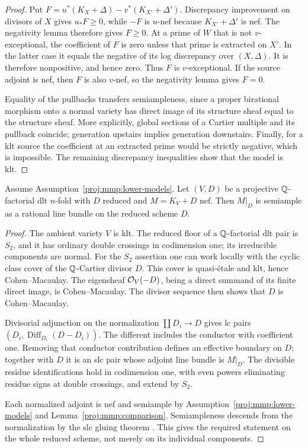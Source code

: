 \begin{proof}
Put \(F=u^*(K_X+\Delta)-v^*(K_{X'}+\Delta')\).
Discrepancy improvement on divisors of \(X\) gives \(u_*F\geq 0\),
while \(-F\) is \(u\)-nef because \(K_{X'}+\Delta'\) is nef.
The negativity lemma therefore gives \(F\geq 0\).
At a prime of \(W\) that is not \(v\)-exceptional, the coefficient
of \(F\) is zero unless that prime is extracted on \(X'\).
In the latter case it equals the negative of its log discrepancy
over \((X,\Delta)\). It is therefore nonpositive, and hence zero.
Thus \(F\) is \(v\)-exceptional. If the source adjoint is nef,
then \(F\) is also \(v\)-nef, so the negativity lemma gives \(F=0\).

Equality of the pullbacks transfers semiampleness, since a proper
birational morphism onto a normal variety has direct image of its
structure sheaf equal to the structure sheaf. More explicitly,
global sections of a Cartier multiple and its pullback coincide;
generation upstairs implies generation downstairs.
Finally, for a klt source the coefficient at an extracted prime
would be strictly negative, which is impossible. The remaining
discrepancy inequalities show that the model is klt.
\end{proof}

\begin{proposition}
\label{proj:prop:boundary-restriction}
Assume Assumption~\ref{proj:mmp:lower-models}. Let \((V,D)\) be a
projective \(\mathbb{Q}\)-factorial dlt \(n\)-fold with \(D\) reduced and
\(M=K_V+D\) nef. Then \(M|_D\) is semiample as a rational line
bundle on the reduced scheme \(D\).
\end{proposition}

\begin{proof}
The ambient variety \(V\) is klt. The reduced floor of a
\(\mathbb{Q}\)-factorial dlt pair is \(S_2\), and it has ordinary double
crossings in codimension one; its irreducible components are normal.
For the \(S_2\) assertion one can work locally with the cyclic
class cover of the \(\mathbb{Q}\)-Cartier divisor \(D\). This cover is
quasi-\'etale and klt, hence Cohen--Macaulay. The eigensheaf
\(\mathcal{O}_V(-D)\), being a direct summand of its finite direct image,
is Cohen--Macaulay. The divisor sequence then shows that \(D\)
is Cohen--Macaulay.

Divisorial adjunction on the normalization
\(\coprod D_i\to D\) gives lc pairs
\((D_i,\operatorname{Diff}_{D_i}(D-D_i))\).
The different includes the conductor with coefficient one.
Removing that conductor contribution defines an effective boundary
on \(D\); together with \(D\) it is an slc pair whose adjoint
line bundle is \(M|_D\). The divisible residue identifications
hold in codimension one, with even powers eliminating residue
signs at double crossings, and extend by \(S_2\).

Each normalized adjoint is nef and semiample by
Assumption~\ref{proj:mmp:lower-models} and
Lemma~\ref{proj:mmp:comparison}.
Semiampleness descends from the normalization by the slc gluing
theorem \cite[Theorem~1.5, equivalently Theorem~4.3]
{FujinoGongyoPluricanonical}. This gives the required statement on the
whole reduced scheme, not merely on its individual components.
\end{proof}

